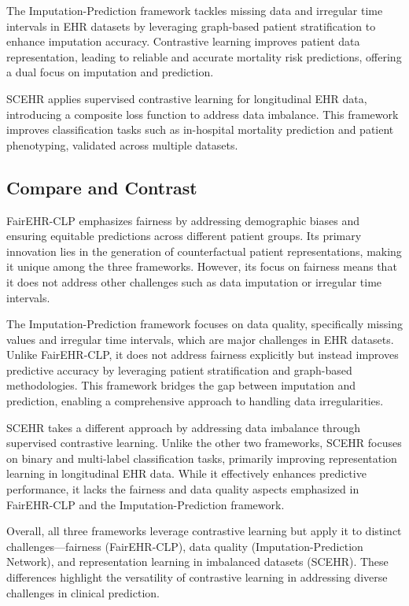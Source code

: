 \documentclass[a4paper]{article}
\begin{document}
    The Imputation-Prediction framework tackles missing data and irregular time intervals
    in EHR datasets by leveraging graph-based patient stratification to enhance imputation
    accuracy. Contrastive learning improves patient data representation, leading
    to reliable and accurate mortality risk predictions, offering a dual focus
    on imputation and prediction.

    SCEHR applies supervised contrastive learning for longitudinal EHR data, introducing
    a composite loss function to address data imbalance. This framework improves
    classification tasks such as in-hospital mortality prediction and patient
    phenotyping, validated across multiple datasets.

    \subsection{Compare and Contrast}
    FairEHR-CLP emphasizes fairness by addressing demographic biases and ensuring
    equitable predictions across different patient groups. Its primary
    innovation lies in the generation of counterfactual patient representations,
    making it unique among the three frameworks. However, its focus on fairness means
    that it does not address other challenges such as data imputation or irregular
    time intervals.

    The Imputation-Prediction framework focuses on data quality, specifically
    missing values and irregular time intervals, which are major challenges in EHR
    datasets. Unlike FairEHR-CLP, it does not address fairness explicitly but instead
    improves predictive accuracy by leveraging patient stratification and graph-based
    methodologies. This framework bridges the gap between imputation and
    prediction, enabling a comprehensive approach to handling data irregularities.

    SCEHR takes a different approach by addressing data imbalance through supervised
    contrastive learning. Unlike the other two frameworks, SCEHR focuses on binary
    and multi-label classification tasks, primarily improving representation
    learning in longitudinal EHR data. While it effectively enhances predictive performance,
    it lacks the fairness and data quality aspects emphasized in FairEHR-CLP and
    the Imputation-Prediction framework.

    Overall, all three frameworks leverage contrastive learning but apply it to distinct
    challenges—fairness (FairEHR-CLP), data quality (Imputation-Prediction Network),
    and representation learning in imbalanced datasets (SCEHR). These
    differences highlight the versatility of contrastive learning in addressing
    diverse challenges in clinical prediction.
\end{document}
